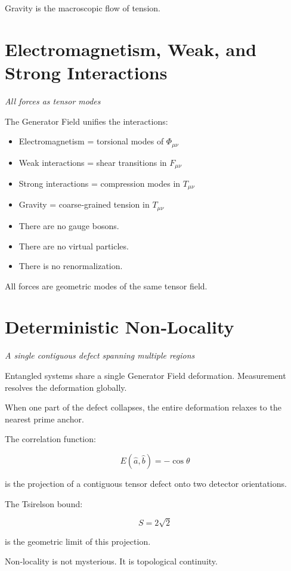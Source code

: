 \documentclass[reprint,amsmath,amssymb,aps,prl,floatfix]{revtex4-2}
\begin{document}
\begin{itemize}
Gravity is the macroscopic flow of tension.

\section{Electromagnetism, Weak, and Strong Interactions}
\textit{All forces as tensor modes}

The Generator Field unifies the interactions:

\begin{itemize}
\item Electromagnetism = torsional modes of \(\Phi_{\mu\nu}\)  
\item Weak interactions = shear transitions in \(F_{\mu\nu}\)  
\item Strong interactions = compression modes in \(T_{\mu\nu}\)  
\item Gravity = coarse‑grained tension in \(T_{\mu\nu}\)
\end{itemize}
\medskip
\begin{itemize}
\item There are no gauge bosons.  
\item There are no virtual particles.  
\item There is no renormalization.
\end{itemize}

All forces are geometric modes of the same tensor field.

\section{Deterministic Non‑Locality}
\textit{A single contiguous defect spanning multiple regions}

Entangled systems share a single Generator Field deformation.  
Measurement resolves the deformation globally.
\medskip

When one part of the defect collapses, the entire deformation relaxes to the nearest prime anchor.    
\medskip

The correlation function:

\[
E(\hat{a}, \hat{b}) = -\cos\theta
\]

is the projection of a contiguous tensor defect onto two detector orientations.

The Tsirelson bound:

\[
S = 2\sqrt{2}
\]

is the geometric limit of this projection.

Non‑locality is not mysterious.  
It is topological continuity.


\end{itemize}
\end{document}
